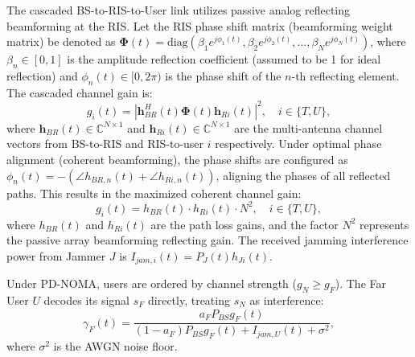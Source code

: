 \documentclass[journal,onecolumn]{IEEEtran}
\begin{document}
The cascaded BS-to-RIS-to-User link utilizes passive analog reflecting beamforming at the RIS. Let the RIS phase shift matrix (beamforming weight matrix) be denoted as $\mathbf{\Phi}(t) = \text{diag}\left( \beta_1 e^{j \phi_1(t)}, \beta_2 e^{j \phi_2(t)}, \dots, \beta_N e^{j \phi_N(t)} \right)$, where $\beta_n \in [0, 1]$ is the amplitude reflection coefficient (assumed to be 1 for ideal reflection) and $\phi_n(t) \in [0, 2\pi)$ is the phase shift of the $n$-th reflecting element. The cascaded channel gain is:
\begin{equation}
    g_i(t) = | \mathbf{h}_{BR}^H(t) \mathbf{\Phi}(t) \mathbf{h}_{Ri}(t) |^2, \quad i \in \{T, U\},
\end{equation}
where $\mathbf{h}_{BR}(t) \in \mathbb{C}^{N \times 1}$ and $\mathbf{h}_{Ri}(t) \in \mathbb{C}^{N \times 1}$ are the multi-antenna channel vectors from BS-to-RIS and RIS-to-user $i$ respectively. Under optimal phase alignment (coherent beamforming), the phase shifts are configured as $\phi_n(t) = - (\angle h_{BR, n}(t) + \angle h_{Ri, n}(t))$, aligning the phases of all reflected paths. This results in the maximized coherent channel gain:
\begin{equation}
    g_i(t) = h_{BR}(t) \cdot h_{Ri}(t) \cdot N^2, \quad i \in \{T, U\},
\end{equation}
where $h_{BR}(t)$ and $h_{Ri}(t)$ are the path loss gains, and the factor $N^2$ represents the passive array beamforming reflecting gain. The received jamming interference power from Jammer $J$ is $I_{jam, i}(t) = P_J(t) h_{Ji}(t)$.

Under PD-NOMA, users are ordered by channel strength ($g_N \ge g_F$). The Far User $U$ decodes its signal $s_F$ directly, treating $s_N$ as interference:
\begin{equation}
    \gamma_F(t) = \frac{a_F P_{BS} g_F(t)}{(1 - a_F) P_{BS} g_F(t) + I_{jam, U}(t) + \sigma^2},
\end{equation}
where $\sigma^2$ is the AWGN noise floor.
\end{document}
